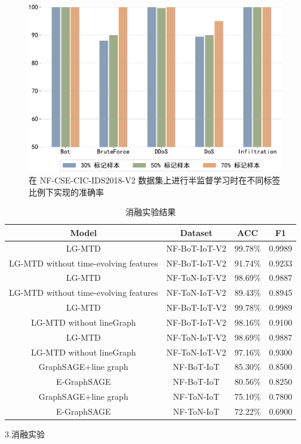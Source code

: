 \documentclass[promaster]{thesis-uestc}
\begin{document}
\begin{figure}[h!]
    \centering
    \includegraphics[width=1\linewidth]{./pic/chart2.pdf}
    \caption{在 NF-CSE-CIC-IDS2018-V2 数据集上进行半监督学习时在不同标签比例下实现的准确率}
    \label{AccOnNF-CSE-CIC-IDS2018-V2}
\end{figure}



\begin{table}[h!]
\centering
\caption{消融实验结果}
\begin{tabular}{c ||c c c}
\hline\hline
\textbf{Model} & \textbf{Dataset} & \textbf{ACC} & \textbf{F1} \\ \hline
LG-MTD & NF-BoT-IoT-V2 & 99.78\% & 0.9989 \\ \hline
LG-MTD without time-evolving features & NF-BoT-IoT-V2 & 91.74\% & 0.9233 \\ \hline
LG-MTD & NF-ToN-IoT-V2 & 98.69\% & 0.9887  \\ \hline
LG-MTD without time-evolving features & NF-ToN-IoT-V2 & 89.43\% & 0.8945 \\ \hline
LG-MTD & NF-BoT-IoT-V2 & 99.78\% & 0.9989 \\ \hline
LG-MTD without lineGraph & NF-BoT-IoT-V2 & 98.16\% & 0.9100 \\ \hline
LG-MTD & NF-ToN-IoT-V2 & 98.69\% & 0.9887 \\ \hline
LG-MTD without lineGraph & NF-ToN-IoT-V2 & 97.16\% & 0.9300 \\ \hline
GraphSAGE+line graph & NF-BoT-IoT & 85.30\% & 0.8500 \\ \hline
E-GraphSAGE & NF-BoT-IoT & 80.56\% & 0.8250 \\ \hline
GraphSAGE+line graph & NF-ToN-IoT & 75.10\% & 0.7800 \\ \hline
E-GraphSAGE & NF-ToN-IoT & 72.22\% & 0.6900 \\ \hline\hline
\end{tabular}
\label{resultofablation}
\end{table}
3.消融实验
\end{document}
